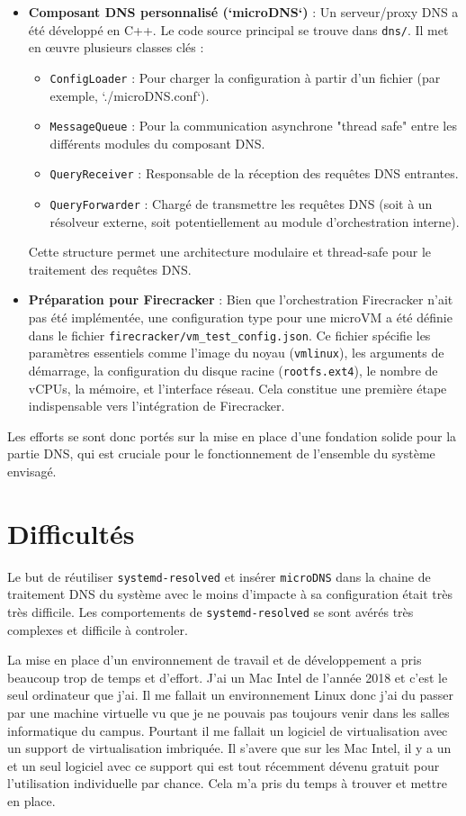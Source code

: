 \documentclass[12pt]{article}
\begin{document}
\begin{itemize}
    \item \textbf{Composant DNS personnalisé (`microDNS`)} : Un serveur/proxy DNS a été développé en C++. Le code source principal se trouve dans \texttt{dns/}. Il met en œuvre plusieurs classes clés :
        \begin{itemize}
            \item \texttt{ConfigLoader} : Pour charger la configuration à partir d'un fichier (par exemple, `./microDNS.conf`).
            \item \texttt{MessageQueue} : Pour la communication asynchrone "thread safe" entre les différents modules du composant DNS.
            \item \texttt{QueryReceiver} : Responsable de la réception des requêtes DNS entrantes.
            \item \texttt{QueryForwarder} : Chargé de transmettre les requêtes DNS (soit à un résolveur externe, soit potentiellement au module d'orchestration interne).
        \end{itemize}
    Cette structure permet une architecture modulaire et thread-safe pour le traitement des requêtes DNS.
    \item \textbf{Préparation pour Firecracker} : Bien que l'orchestration Firecracker n'ait pas été implémentée, une configuration type pour une microVM a été définie dans le fichier \texttt{firecracker/vm\_test\_config.json}. Ce fichier spécifie les paramètres essentiels comme l'image du noyau (\texttt{vmlinux}), les arguments de démarrage, la configuration du disque racine (\texttt{rootfs.ext4}), le nombre de vCPUs, la mémoire, et l'interface réseau. Cela constitue une première étape indispensable vers l'intégration de Firecracker.
\end{itemize}
Les efforts se sont donc portés sur la mise en place d'une fondation solide pour la partie DNS, qui est cruciale pour le fonctionnement de l'ensemble du système envisagé.

\section{Difficultés}
Le but de réutiliser \texttt{systemd-resolved} et insérer \texttt{microDNS} dans la chaine de traitement DNS du système avec le moins d'impacte à sa configuration était très très difficile. Les comportements de \texttt{systemd-resolved} se sont avérés très complexes et difficile à controler.

La mise en place d'un environnement de travail et de développement a pris beaucoup trop de temps et d'effort. J'ai un Mac Intel de l'année 2018 et c'est le seul ordinateur que j'ai. Il me fallait un environnement Linux donc j'ai du passer par une machine virtuelle vu que je ne pouvais pas toujours venir dans les salles informatique du campus. Pourtant il me fallait un logiciel de virtualisation avec un support de virtualisation imbriquée. Il s'avere que sur les Mac Intel, il y a un et un seul logiciel avec ce support qui est tout récemment dévenu gratuit pour l'utilisation individuelle par chance. Cela m'a pris du temps à trouver et mettre en place.
\end{document}
